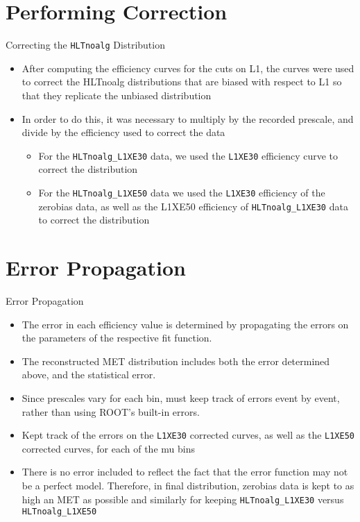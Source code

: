 \documentclass[draft]{beamer}
\begin{document}
\section{Performing Correction}
\begin{frame}{Correcting the \texttt{HLTnoalg} Distribution}
		\begin{itemize}
				\item After computing the efficiency curves for the cuts on L1, the curves were used to correct the HLTnoalg distributions that are biased with respect to L1 so that they replicate the unbiased distribution
				\item In order to do this, it was necessary to multiply by the recorded prescale, and divide by the efficiency used to correct the data
				\begin{itemize}
						\item For the \texttt{HLTnoalg\_L1XE30} data, we used the \texttt{L1XE30} efficiency curve to correct the distribution
						\item For the \texttt{HLTnoalg\_L1XE50} data we used the \texttt{L1XE30} efficiency of the zerobias data, as well as the L1XE50 efficiency of \texttt{HLTnoalg\_L1XE30} data to correct the distribution
				\end{itemize}
		\end{itemize}
\end{frame}
\section{Error Propagation}
\begin{frame}{Error Propagation}
		\begin{itemize}
				\item The error in each efficiency value is determined by propagating the errors on the parameters of the respective fit function.
				\item The reconstructed MET distribution includes both the error determined above, and the statistical error. 
				\item Since prescales vary for each bin, must keep track of errors event by event, rather than using ROOT’s built-in errors. 
				\item Kept track of the errors on the \texttt{L1XE30} corrected curves, as well as the \texttt{L1XE50} corrected curves, for each of the mu bins
                \item There is no error included to reflect the fact that the error function may not be a perfect model. Therefore, in final distribution, zerobias data is kept to as high an MET as possible and similarly for keeping \texttt{HLTnoalg\_L1XE30} versus \texttt{HLTnoalg\_L1XE50}
        \end{itemize}
\end{frame}
\begin{frame}
\end{frame}
\begin{frame}
\end{frame}
\end{document}
